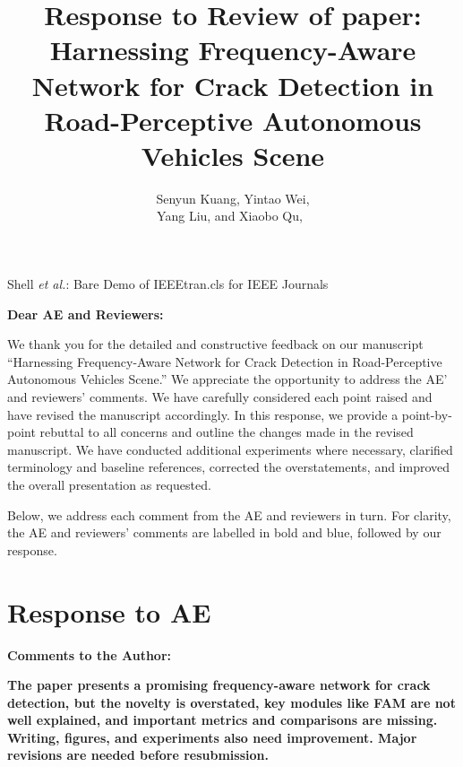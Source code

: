 \documentclass[lettersize,journal,onecolumn,12pt]{IEEEtran}
\begin{document}

\title{Response to Review of paper:\\
Harnessing Frequency-Aware Network for Crack Detection in Road-Perceptive Autonomous Vehicles Scene}

\author{Senyun Kuang, Yintao Wei,

Yang Liu, and Xiaobo Qu,~
}

%
{Shell \MakeLowercase{\textit{et al.}}: Bare Demo of IEEEtran.cls for IEEE Journals}

\maketitle

\textbf{Dear AE and Reviewers:}

We thank you for the detailed and constructive feedback on our manuscript “Harnessing Frequency-Aware Network for Crack Detection in Road-Perceptive Autonomous Vehicles Scene.” 
We 
appreciate the opportunity to address the AE' and reviewers’ comments. 
We have carefully considered each point raised and have revised the manuscript accordingly. 
In this response, we provide a point-by-point rebuttal to all concerns and outline the changes made in the revised manuscript. 
We have conducted additional experiments where necessary, clarified terminology and baseline references, corrected the overstatements, and improved the overall presentation as requested.

Below, we address each comment from the AE and reviewers in turn. 
For clarity, the AE and reviewers’ comments are labelled in bold and blue, followed by our response.

\clearpage

\tableofcontents
\newpage

\section{Response to AE}

{\color{BlueGreen} \textbf{Comments to the Author:}

\textbf{The paper presents a promising frequency-aware network for crack detection, but the novelty is overstated, key modules like FAM are not well explained, and important metrics and comparisons are missing. Writing, figures, and experiments also need improvement. Major revisions are needed before resubmission.}} 
\end{document}
